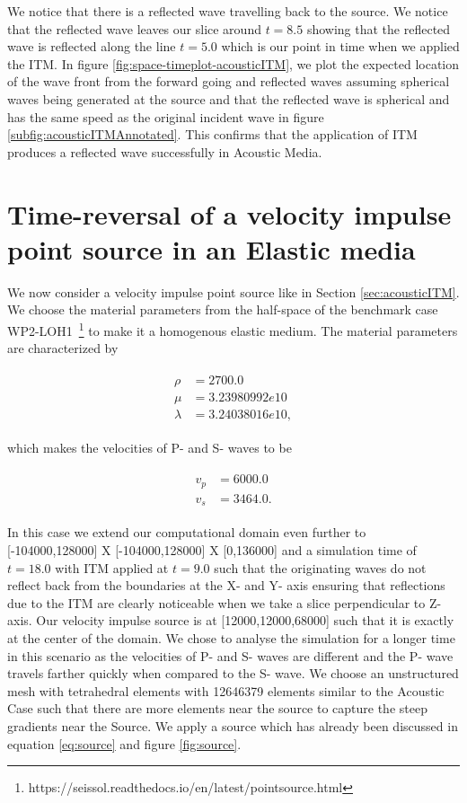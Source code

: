 We notice that there is a reflected wave travelling back to the source. We notice that the reflected wave leaves our slice around $t=8.5$ showing that the reflected wave
is reflected along the line $t=5.0$ which is our point in time when we applied the \ac{ITM}. In figure \ref{fig:space-timeplot-acousticITM}, we plot the expected
location of the wave front from the forward going and reflected waves assuming spherical waves being generated at the source and that the reflected wave is spherical
and has the same speed as the original incident wave in figure \ref{subfig:acousticITMAnnotated}. This confirms that the application of \ac{ITM} produces a reflected wave
successfully in Acoustic Media. \\

\section{Time-reversal of a velocity impulse point source in an Elastic media} \label{sec:elasticITM}
We now consider a velocity impulse point source like in Section \ref{sec:acousticITM}. We choose the material parameters from the half-space of the 
benchmark case WP2-LOH1~\footnote[1]{https://seissol.readthedocs.io/en/latest/pointsource.html} to make it a homogenous elastic medium. The material parameters 
are characterized by

\begin{align}
    \begin{split}
        \rho &=    2700.0 \\
        \mu &=     3.23980992e10 \\
        \lambda &= 3.24038016e10 ,
    \end{split}
\end{align}

which makes the velocities of P- and S- waves to be

\begin{align}
    \begin{split}
        v_p &= 6000.0 \\
        v_s &= 3464.0 .
    \end{split}
\end{align}

In this case we extend our computational domain even further to [-104000,128000] X [-104000,128000] X [0,136000] and a simulation time of $t=18.0$ with \ac{ITM} applied at $t=9.0$
such that the originating waves do not reflect back from the boundaries at the X- and Y- axis ensuring that reflections due to the \ac{ITM} are clearly noticeable when we take a slice perpendicular to Z- axis.
Our velocity impulse source is at [12000,12000,68000] such that it is exactly at the center of the domain.
We chose to analyse the simulation for a longer time in this scenario as the velocities of P- and S- waves are different and the P- wave travels farther quickly when compared to 
the S- wave. We choose an unstructured mesh with tetrahedral elements with 12646379 elements similar to the Acoustic Case such that there are more elements near the source
to capture the steep gradients near the Source. We apply a source which has already been discussed in equation \ref{eq:source} and figure \ref{fig:source}. \\

